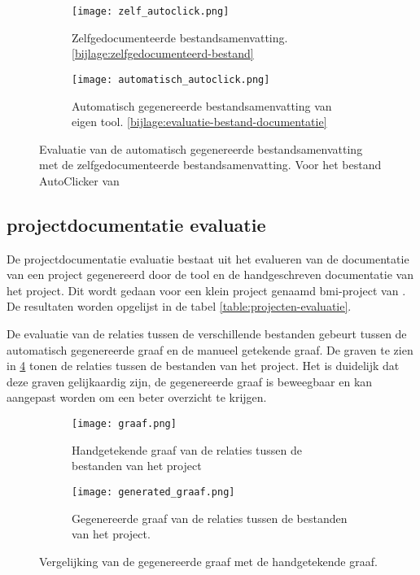 \begin{figure}
    \centering
    \begin{subfigure}[b]{1\textwidth}
        \centering
        \texttt{[image: zelf\_autoclick.png]}
        \caption{Zelfgedocumenteerde bestandsamenvatting. \ref{bijlage:zelfgedocumenteerd-bestand}}
        \label{fig:zelfgedocumenteerd-bestandsamenvatting}
    \end{subfigure}
    \hfill
    \begin{subfigure}[b]{1\textwidth}
        \centering
        \texttt{[image: automatisch\_autoclick.png]}
        \caption{Automatisch gegenereerde bestandsamenvatting van eigen tool. \ref{bijlage:evaluatie-bestand-documentatie}}
        \label{fig:automatisch-bestandsamenvatting}
    \end{subfigure}
    \caption{Evaluatie van de automatisch gegenereerde bestandsamenvatting met de zelfgedocumenteerde bestandsamenvatting. Voor het bestand AutoClicker van \textcite{Waegeneer2022}}
    \label{fig:evaluatie-bestand-documentatie}
\end{figure}


\subsection{projectdocumentatie evaluatie}
\label{sec:project-documentatie-evaluatie-project}

De projectdocumentatie evaluatie bestaat uit het evalueren van de documentatie van een project gegenereerd door de tool en de handgeschreven documentatie van het project.
Dit wordt gedaan voor een klein project genaamd bmi-project van \textcite{Simmons2019}.
De resultaten worden opgelijst in de tabel \ref{table:projecten-evaluatie}.

De evaluatie van de relaties tussen de verschillende bestanden gebeurt tussen de automatisch gegenereerde graaf en de manueel getekende graaf.
De graven te zien in \ref{fig:evaluatie-graaf} tonen de relaties tussen de bestanden van het project. 
Het is duidelijk dat deze graven gelijkaardig zijn, de gegenereerde graaf is beweegbaar en kan aangepast worden om een beter overzicht te krijgen.

\begin{figure}
    \centering
    \begin{subfigure}[b]{1\textwidth}
        \centering
        \texttt{[image: graaf.png]}
        \caption{Handgetekende graaf van de relaties tussen de bestanden van het project \autocite{Simmons2019}}
    \end{subfigure}
    \hfill
    \begin{subfigure}[b]{0.5\textwidth}
        \centering
        \texttt{[image: generated\_graaf.png]}
        \caption{Gegenereerde graaf van de relaties tussen de bestanden van het project. \autocite{Simmons2019}}
    \end{subfigure}
    \caption{Vergelijking van de gegenereerde graaf met de handgetekende graaf.}
    \label{fig:evaluatie-graaf}
\end{figure}

